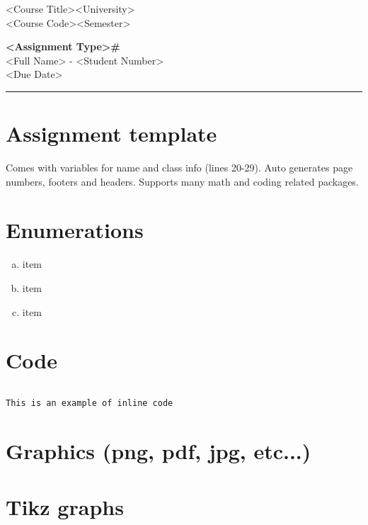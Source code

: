 \documentclass[fleqn, 12pt]{article}
\newcommand{\university}{<University>}
\newcommand{\name}{<Full Name>}
\newcommand{\studentNumber}{<Student Number>}
\newcommand{\semester}{<Semester>}
\newcommand{\assignmentType}{<Assignment Type>}
\newcommand{\assignmentNumber}{<Assignment Number>}
\newcommand{\dueDate}{<Due Date>}
\newcommand{\courseCode}{<Course Code>}
\newcommand{\courseTitle}{<Course Title>}
\newcommand{\essayTitle}{<Title>} %
\newcommand{\essaySubtitle}{<subtitle>} %
\newcommand{\essayAbstract}{} %
\newcommand{\code}[1]{\colorbox{codegray}{\texttt{#1}}}
\newcommand{\codefile}{\inputminted}
\newcommand{\beginassignemnt}{
    \newlength\tindent
    \setlength{\tindent}{\parindent}
    \setlength{\parindent}{0pt}

    \thispagestyle{assignment}
    \noindent
    \courseTitle \hfill \university\\
    \courseCode \hfill \semester
    \begin{center}
        \textbf{\assignmentType\text{ }\#\assignmentNumber}\\
        \name \hspace{1pt} - \studentNumber\\
        \dueDate\\
    \end{center}
    \vspace{6pt}
    \hrule
    \vspace{1.5\headsep}
}
\newcommand{\beginessay}{
    \nocite{*}

    \pagestyle{frontmatter}
    \pagenumbering{roman}

    \begin{center}
        \normalsize
        \textsc{\university}\\[5cm]
        \LARGE \textbf{\MakeUppercase{\essayTitle}}\\[0.5cm]
        \large \text{ }\essaySubtitle\text{ }\\[10cm] %
        \normalsize
        \textsc{\name}\\
        \textsc{\studentNumber}\\
        \textsc{\courseCode}\\
        \textsc{\semester}\\
        \textsc{\dueDate}
    \end{center}
    \thispagestyle{empty}

    \newpage
    \tableofcontents
    \newpage

    \iftotalfigures
        \addcontentsline{toc}{section}{\listfigurename}
        \listoffigures
    \fi
    \iftotaltables
        \addcontentsline{toc}{section}{\listtablename}
        \listoftables
    \fi

    \ifdefempty{\essayAbstract}{}{
        \newpage
        \addcontentsline{toc}{section}{Abstract}
        \begin{abstract}
            \essayAbstract
        \end{abstract}

    }
    \label{EndFrontMatter}
    \newpage

    \pagenumbering{arabic}
    \pagestyle{body}
}
\begin{document}
\beginassignemnt


\section*{Assignment template}

Comes with variables for name and class info (lines 20-29). Auto generates page numbers, footers and headers. Supports many math and coding related packages.

\section*{Enumerations}

\begin{enumerate}[a)]
    \item item
    \item item
    \item item
\end{enumerate}

\section*{Code}

\codefile{javascript}{code/sample.js}

\code{This is an example of inline code}

\section*{Graphics (png, pdf, jpg, etc...)}


\newpage

\section*{Tikz graphs}
\end{document}

